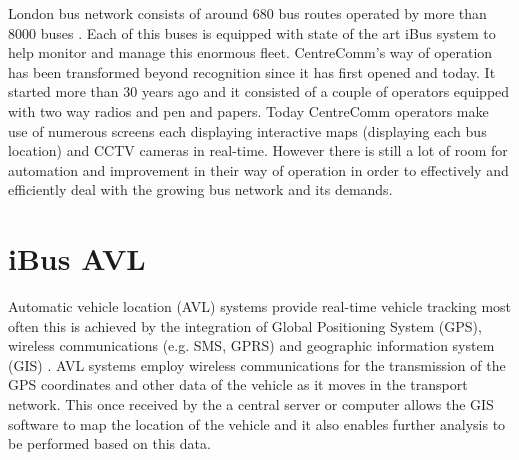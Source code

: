 London bus network consists of around 680 bus routes operated by more than 8000 buses \cite{glads}. Each of this buses is equipped with state of the art iBus system to help monitor and manage this enormous fleet. CentreComm's way of operation has been transformed beyond recognition since it has first opened and today. It started more than 30 years ago \cite{centreComm} and it consisted of a couple of operators equipped with two way radios and pen and papers. Today CentreComm operators make use of numerous screens each displaying interactive maps (displaying each bus location) and CCTV cameras in real-time. However there is still a lot of room for automation and improvement in their way of operation in order to effectively and efficiently deal with the growing bus network and its demands.

\section{iBus AVL}
Automatic vehicle location (AVL) systems provide real-time vehicle tracking most often this is achieved by the integration of Global Positioning System (GPS), wireless communications (e.g. SMS, GPRS) and geographic information system (GIS) \cite{riter1977automatic}. AVL systems employ wireless communications for the transmission of the GPS coordinates and other data of the vehicle as it moves in the transport network. This once received by the a central server or computer allows the GIS software to map the location of the vehicle and it also enables further analysis to be performed based on this data.
 
